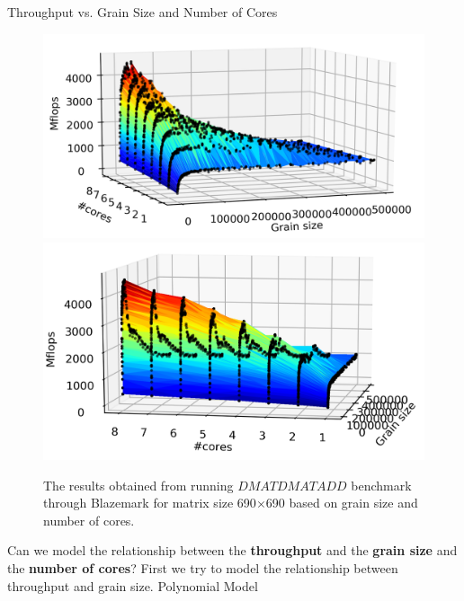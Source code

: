 \documentclass[10pt]{beamer}
\begin{document}
\begin{frame}{Throughput vs. Grain Size and Number of Cores}
	\begin{outline}
		\begin{figure}[H]
			\includegraphics[scale=0.42]{images/fig2.png}					\includegraphics[scale=0.42]{images/fig3.png}
			\caption{The results obtained from running $DMATDMATADD$ benchmark through Blazemark for matrix size 690$\times$690 based on grain size and number of cores.}	
			\label{fig29}
		\end{figure}
\pause
	Can we model the relationship between the \textbf{throughput} and the \textbf{grain size} and the \textbf{number of cores}?
\pause	
\1First we try to model the relationship between throughput and grain size.
\pause	
\2Polynomial Model
\end{outline}
\end{frame}

%
\end{document}
